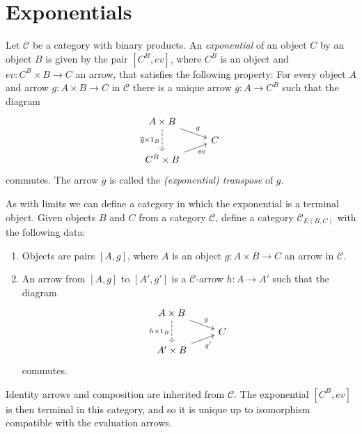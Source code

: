 \documentclass[article, a4paper, 11pt, oneside]{memoir}
\numberwithin{equation}{chapter}
\newcommand{\cat}[1]{\mathcal{#1}}
\newcommand{\catC}{\cat{C}}
\theoremstyle{myexample}
\theoremstyle{myexamplebreak}
\begin{document}
\chapter{Exponentials}

\newcommand{\eval}{\mathit{ev}}

\begin{definition}[Exponentials]
    Let $\catC$ be a category with binary products. An \emph{exponential} of an object $C$ by an object $B$ is given by the pair\footnotemark{} $[C^B, \eval]$, where $C^B$ is an object and $\eval \colon C^B \times B \to C$ an arrow, that satisfies the following property: For every object $A$ and arrow $g \colon A \times B \to C$ in $\catC$ there is a unique arrow $\overline g \colon A \to C^B$ such that the diagram
    \begin{equation*}
        \begin{tikzcd}[row sep=tiny]
            A \times B
                \ar[dd, "\overline g \times 1_B", swap, dashed]
                \ar[dr, "g"]
            \\
            & C
            \\
            C^B \times B
                \ar[ur, "\eval", swap]
        \end{tikzcd}
    \end{equation*}
    commutes. The arrow $\overline g$ is called the \emph{(exponential) transpose} of $g$.
\end{definition}
%
As with limits we can define a category in which the exponential is a terminal object. Given objects $B$ and $C$ from a category $\catC$, define a category $\catC_{E(B,C)}$ with the following data:
%
\begin{enumerate}
    \item Objects are pairs $[A, g]$, where $A$ is an object $g \colon A \times B \to C$ an arrow in $\catC$.

    \item An arrow from $[A,g]$ to $[A',g']$ is a $\catC$-arrow $h \colon A \to A'$ such that the diagram
    \begin{equation*}
        \begin{tikzcd}[row sep=tiny]
            A \times B
                \ar[dd, "h \times 1_B", swap, dashed]
                \ar[dr, "g"]
            \\
            & C
            \\
            A' \times B
                \ar[ur, "g'", swap]
        \end{tikzcd}
    \end{equation*}
    commutes.
\end{enumerate}
%
Identity arrows and composition are inherited from $\catC$. The exponential $[C^B, \eval]$ is then terminal in this category, and so it is unique up to isomorphism compatible with the evaluation arrows.
\end{document}
